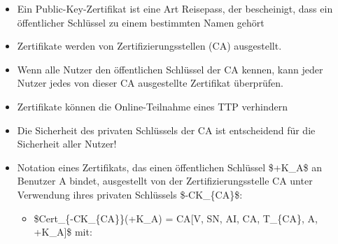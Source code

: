 \documentclass[a4paper]{article}
\begin{document}
\begin{multicols}{3}
    \begin{itemize}
        \item
              Ein Public-Key-Zertifikat ist eine Art Reisepass, der bescheinigt,
              dass ein öffentlicher Schlüssel zu einem bestimmten Namen gehört
        \item
              Zertifikate werden von Zertifizierungsstellen (CA) ausgestellt.
        \item
              Wenn alle Nutzer den öffentlichen Schlüssel der CA kennen, kann jeder
              Nutzer jedes von dieser CA ausgestellte Zertifikat überprüfen.
        \item
              Zertifikate können die Online-Teilnahme eines TTP verhindern
        \item
              Die Sicherheit des privaten Schlüssels der CA ist entscheidend für die
              Sicherheit aller Nutzer!
        \item
              Notation eines Zertifikats, das einen öffentlichen Schlüssel \$+K\_A\$
              an Benutzer A bindet, ausgestellt von der Zertifizierungsstelle CA
              unter Verwendung ihres privaten Schlüssels \$-CK\_\{CA\}\$:

              \begin{itemize}
                  \item
                        \$Cert\_\{-CK\_\{CA\}\}(+K\_A) = CA{[}V, SN, AI, CA, T\_\{CA\}, A,
                        +K\_A{]}\$ mit:


\end{itemize}
\end{itemize}
\end{multicols}
\end{document}
